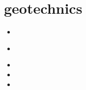 \section{geotechnics}

\begin{small}
\begin{itemize}
\item[\nineteenninetynine] 
\item[\twothousandthree] 
 \\
\item[\twothousandfour] 
\item[\twothousandsix] 
\item[\twothousandfourteen] 
\end{itemize}
\end{small}






